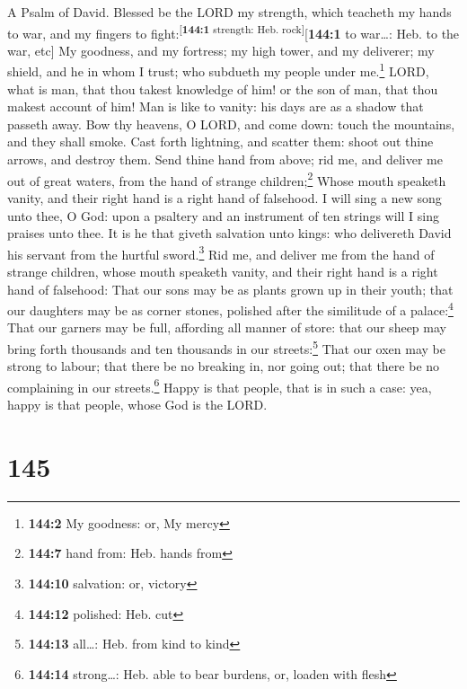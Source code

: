 A Psalm of David.  Blessed be the LORD my strength, which
teacheth my hands to war, and my fingers to
fight:\textsuperscript{{[}\textbf{144:1} strength: Heb.
rock{]}}{[}\textbf{144:1} to war\ldots: Heb. to the war, etc{]}
 My goodness, and my fortress; my high tower, and my
deliverer; my shield, and he in whom I trust; who subdueth my people
under me.\footnote{\textbf{144:2} My goodness: or, My mercy}
 LORD, what is man, that thou takest knowledge of him! or
the son of man, that thou makest account of him!  Man is
like to vanity: his days are as a shadow that passeth away.
 Bow thy heavens, O LORD, and come down: touch the
mountains, and they shall smoke.  Cast forth lightning,
and scatter them: shoot out thine arrows, and destroy them.
 Send thine hand from above; rid me, and deliver me out of
great waters, from the hand of strange children;\footnote{\textbf{144:7}
  hand from: Heb. hands from}  Whose mouth speaketh
vanity, and their right hand is a right hand of falsehood.
 I will sing a new song unto thee, O God: upon a psaltery
and an instrument of ten strings will I sing praises unto thee.
 It is he that giveth salvation unto kings: who
delivereth David his servant from the hurtful sword.\footnote{\textbf{144:10}
  salvation: or, victory}  Rid me, and deliver me from
the hand of strange children, whose mouth speaketh vanity, and their
right hand is a right hand of falsehood:  That our sons
may be as plants grown up in their youth; that our daughters may be as
corner stones, polished after the similitude of a palace:\footnote{\textbf{144:12}
  polished: Heb. cut}  That our garners may be full,
affording all manner of store: that our sheep may bring forth thousands
and ten thousands in our streets:\footnote{\textbf{144:13} all\ldots:
  Heb. from kind to kind}  That our oxen may be strong to
labour; that there be no breaking in, nor going out; that there be no
complaining in our streets.\footnote{\textbf{144:14} strong\ldots: Heb.
  able to bear burdens, or, loaden with flesh}  Happy is
that people, that is in such a case: yea, happy is that people, whose
God is the LORD.

\hypertarget{section-146}{%
\section{145}\label{section-146}}

